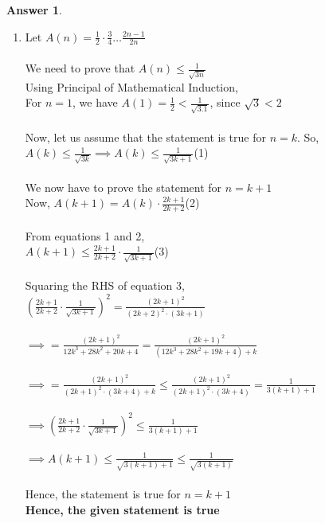 \documentclass[a4paper]{article}
\theoremstyle{definition}
\newtheorem{answer}{Answer}
\begin{document}
\begin{answer}
\begin{enumerate}
        \item Let $A(n) = \frac{1}{2} \cdot \frac{3}{4} \ldots \frac{2n - 1}{2n}$\\\\
        We need to prove that $A(n) \le \frac{1}{\sqrt{3n}}$\\
        Using Principal of Mathematical Induction,\\
        For $n = 1$, we have $A(1) = \frac{1}{2} < \frac{1}{\sqrt{3.1}}$, since $\sqrt{3} < 2$\\\\
        Now, let us assume that the statement is true for $n = k$.
        So,\\
        $A(k) \le \frac{1}{\sqrt{3k}} \implies A(k) \le \frac{1}{\sqrt{3k + 1}}$\space\space\space\space (1)\\\\
        We now have to prove the statement for $n = k + 1$\\
        Now, $A(k + 1) = A(k) \cdot \frac{2k + 1}{2k + 2}$\space\space\space\space (2)\\\\
        From equations 1 and 2, \\
        $A(k + 1) \le \frac{2k + 1}{2k + 2} \cdot \frac{1}{\sqrt{3k + 1}}$\space\space\space\space (3)\\\\
        Squaring the RHS of equation 3, \\
        $\left(\frac{2k + 1}{2k + 2} \cdot \frac{1}{\sqrt{3k + 1}}\right)^2 = \frac{(2k + 1)^2}{(2k + 2)^2 \cdot (3k + 1)}$\\\\
        $\implies = \frac{(2k + 1)^2}{12k^3 + 28k^2 + 20k + 4} = \frac{(2k + 1)^2}{(12k^3 + 28k^2 + 19k + 4) + k}$\\\\
        $\implies = \frac{(2k + 1)^2}{(2k + 1)^2 \cdot (3k + 4) + k} \leq \frac{(2k + 1)^2}{(2k + 1)^2 \cdot (3k + 4)} = \frac{1}{3(k + 1) + 1}$\\\\
        $\implies \left(\frac{2k + 1}{2k + 2} \cdot \frac{1}{\sqrt{3k + 1}}\right)^2 \leq \frac{1}{3(k + 1) + 1}$\\\\
        $\implies A(k + 1) \leq \frac{1}{\sqrt{3(k + 1) + 1}} \leq \frac{1}{\sqrt{3(k + 1)}}$\\\\
        Hence, the statement is true for $n = k + 1$\\
        \textbf{Hence, the given statement is true}
        
    \end{enumerate}
    
\end{answer}
\end{document}
